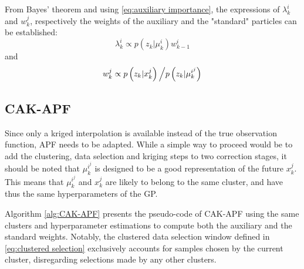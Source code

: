 \documentclass[conference]{IEEEtran}
\begin{document}
From Bayes' theorem and using \eqref{eq:auxiliary importance}, the expressions of $\lambda_k^i$ and $w_k^j$, respectively the weights of the auxiliary and the "standard" particles can be established:
\begin{equation}
\lambda_k^i\propto p(z_k|\mu_k^i)w_{k-1}^i\label{eq:auxiliary weights}
\end{equation}
and
\begin{equation}
w_k^j\propto p\left(z_k|x_k^j\right)\left/p\left(z_k|\mu_k^{i^j}\right)\right.\label{eq:principal weights}
\end{equation}

\subsection{CAK-APF}\label{sec:CAK-APF}

Since only a kriged interpolation is available instead of the true observation function, APF needs to be adapted. While a simple way to proceed would be to add the clustering, data selection and kriging steps to two correction stages, it should be noted that $\mu_k^{i^j}$ is designed to be a good representation of the future $x_k^j$. This means that $\mu_k^{i^j}$ and $x_k^j$ are likely to belong to the same cluster, and have thus the same hyperparameters of the GP.

Algorithm \ref{alg:CAK-APF} presents the pseudo-code of CAK-APF using the same clusters and hyperparameter estimations to compute both the auxiliary and the standard weights. Notably, the clustered data selection window defined in \ref{eq:clustered selection} exclusively accounts for samples chosen by the current cluster, disregarding selections made by any other clusters.

\begin{algorithm}[ht]
\begin{algorithmic}
\EndFor
{}
\EndFor
\EndFor
{}
\EndFor
{}
\EndFor
{}
\EndFor
\end{algorithmic} \caption{CAK-APF}\label{alg:CAK-APF}
\end{algorithm}
\end{document}
